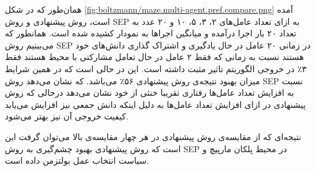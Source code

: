 همان‌طور که در شکل
\ref{fig:boltzmann/maze.multi-agent.pref.compare.png}
آمده است، روش پیشنهادی و روش SEP به ازای تعداد عامل‌های ۲، ۳، ۵، ۱۰ و ۲۰ عدد به تعداد ۲۰ بار اجرا درآمده و میانگین اجراها به نمودار کشیده شده است. همانطور که می‌بینیم روش SEP در زمانی ۲۰ عامل در حال یادگیری و اشتراک گذاری دانش‌های خود هستند نسبت به زمانی که فقط ۲ عامل در حال تعامل مشارکتی با محیط هستند فقط ۳٪ در خروجی الگوریتم تاثیر مثبت داشته است. این در حالی است که در همین شرایط میزان بهبود نتیجه‌ی روش پیشنهادی ۵۶٪ می‌باشد. که نشان می‌دهد روش SEP نسبت به افزایش تعداد عامل‌ها رفتاری تقریبا خنثی از خود نشان می‌دهد درحالی که روش پیشنهادی در ازای افزایش تعداد عامل‌ها به دلیل اینکه دانش جمعی نیز افزایش می‌یابد کیفیت خروجی آن نیز بهتر می‌شود.


 نتیجه‌ای که از مقایسه‌ی روش پیشنهادی در هر چهار مقایسه‌ی بالا می‌توان گرفت این است که روش پیشنهادی بهبود چشم‌گیری به روش SEP در محیط پلکان مارپیچ و سیاست انتخاب عمل بولتزمن داده است.